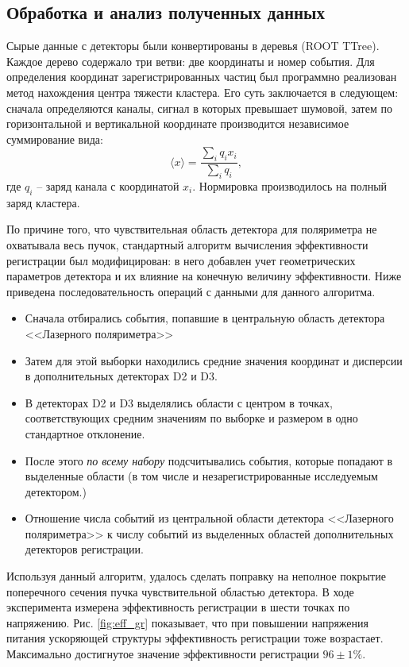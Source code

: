 \subsection{Обработка и анализ полученных данных}
Сырые данные с детекторы были конвертированы в деревья (ROOT TTree). Каждое дерево содержало три ветви: две координаты и номер события. Для определения координат зарегистрированных частиц был программно реализован метод нахождения центра тяжести кластера. Его суть заключается в следующем: сначала определяются каналы, сигнал в которых превышает шумовой, затем по горизонтальной и вертикальной координате производится независимое суммирование вида: 
\begin{equation}
 \langle x \rangle = \frac{\sum_{i}q_i x_i}{\sum_{i}q_i},
\end{equation}
где $q_i$ -- заряд канала с координатой $x_i$. Нормировка производилось на полный заряд кластера.
\par По причине того, что чувствительная область детектора для поляриметра не охватывала весь пучок, стандартный алгоритм вычисления эффективности регистрации был модифицирован: в него добавлен учет геометрических параметров детектора и их влияние на конечную величину эффективности. Ниже приведена последовательность операций с данными для данного алгоритма.
\begin{itemize}
	\item Сначала отбирались события, попавшие в центральную область детектора <<Лазерного поляриметра>>
	\item Затем для этой выборки находились средние значения координат и дисперсии в дополнительных детекторах D2 и D3. 
	\item В детекторах D2 и D3 выделялись области с центром в точках, соответствующих средним значениям по выборке и размером в одно стандартное отклонение. 
	\item После этого \textit {по всему набору} подсчитывались события, которые попадают в выделенные области (в том числе и незарегистрированные исследуемым детектором.)
	\item Отношение числа событий из центральной области детектора <<Лазерного поляриметра>> к числу событий из выделенных областей дополнительных детекторов  регистрации. 
\end{itemize}
Используя данный алгоритм, удалось сделать поправку на неполное покрытие поперечного сечения пучка чувствительной областью детектора.
В ходе эксперимента измерена эффективность регистрации в шести точках по напряжению. Рис. \ref{fig:eff_gr} показывает, что при повышении напряжения питания ускоряющей структуры эффективность регистрации тоже возрастает. Максимально достигнутое значение эффективности регистрации $96 \pm 1\%$. 
